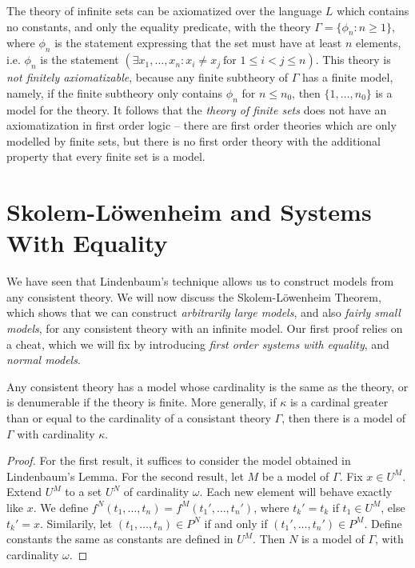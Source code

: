 \begin{example}
    The theory of infinite sets can be axiomatized over the language $L$ which contains no constants, and only the equality predicate, with the theory $\Gamma = \{ \phi_n : n \geq 1 \}$, where $\phi_n$ is the statement expressing that the set must have at least $n$ elements, i.e. $\phi_n$ is the statement $(\exists x_1, \dots, x_n: x_i \neq x_j\ \text{for $1 \leq i < j \leq n$})$. This theory is \emph{not finitely axiomatizable}, because any finite subtheory of $\Gamma$ has a finite model, namely, if the finite subtheory only contains $\phi_n$ for $n \leq n_0$, then $\{ 1, \dots, n_0 \}$ is a model for the theory. It follows that the \emph{theory of finite sets} does not have an axiomatization in first order logic -- there are first order theories which are only modelled by finite sets, but there is no first order theory with the additional property that every finite set is a model.
\end{example}

\section{Skolem-L\"{o}wenheim and Systems With Equality}

We have seen that Lindenbaum's technique allows us to construct models from any consistent theory. We will now discuss the Skolem-L\"{o}wenheim Theorem, which shows that we can construct \emph{arbitrarily large models}, and also \emph{fairly small models}, for any consistent theory with an infinite model. Our first proof relies on a cheat, which we will fix by introducing \emph{first order systems with equality}, and \emph{normal models}.

\begin{theorem}
    Any consistent theory has a model whose cardinality is the same as the theory, or is denumerable if the theory is finite. More generally, if $\kappa$ is a cardinal greater than or equal to the cardinality of a consistant theory $\Gamma$, then there is a model of $\Gamma$ with cardinality $\kappa$.
\end{theorem}
\begin{proof}
    For the first result, it suffices to consider the model obtained in Lindenbaum's Lemma. For the second result, let $M$ be a model of $\Gamma$. Fix $x \in U^M$. Extend $U^M$ to a set $U^N$ of cardinality $\omega$. Each new element will behave exactly like $x$. We define $f^N(t_1, \dots, t_n) = f^M(t_1', \dots, t_n')$, where $t_k' = t_k$ if $t_1 \in U^M$, else $t_k' = x$. Similarily, let $(t_1, \dots, t_n) \in P^N$ if and only if $(t_1', \dots, t_n') \in P^M$. Define constants the same as constants are defined in $U^M$. Then $N$ is a model of $\Gamma$, with cardinality $\omega$.
\end{proof}

